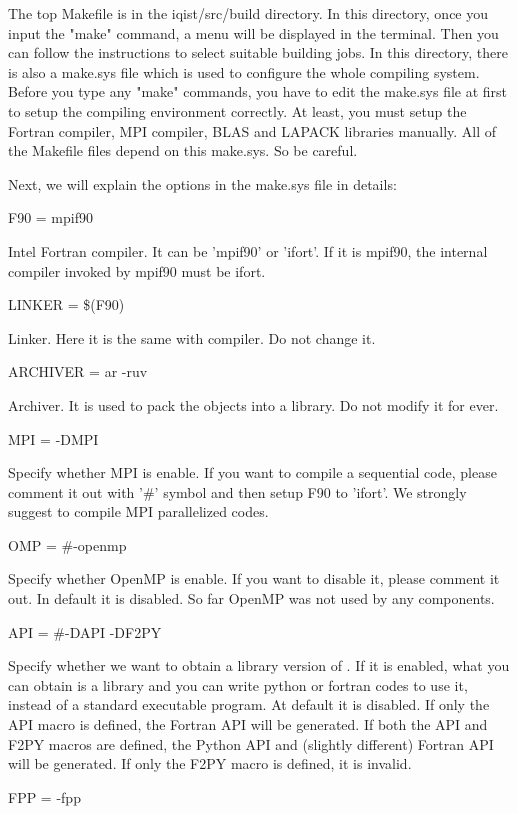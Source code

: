 The top Makefile is in the iqist/src/build directory. In this directory, once you input the "make" command, a menu will be displayed in the terminal. Then you can follow the instructions to select suitable building jobs. In this directory, there is also a make.sys file which is used to configure the whole compiling system. Before you type any "make" commands, you have to edit the make.sys file at first to setup the compiling environment correctly. At least, you must setup the Fortran compiler, MPI compiler, BLAS and LAPACK libraries manually. All of the Makefile files depend on this make.sys. So be careful.

Next, we will explain the options in the make.sys file in details:

{\color{red}F90    = mpif90}

Intel Fortran compiler. It can be 'mpif90' or 'ifort'. If it is mpif90, the internal compiler invoked by mpif90 must be ifort.

{\color{red}LINKER = \$(F90)}

Linker. Here it is the same with compiler. Do not change it.

{\color{red}ARCHIVER = ar -ruv}

Archiver. It is used to pack the objects into a library. Do not modify it for ever.

{\color{red}MPI    = -DMPI}

Specify whether MPI is enable. If you want to compile a sequential code, please comment it out with '\#' symbol and then setup F90 to 'ifort'. We strongly suggest to compile MPI parallelized codes.

{\color{red}OMP    = \#-openmp}

Specify whether OpenMP is enable. If you want to disable it, please
comment it out. In default it is disabled. So far OpenMP was not used
by any components.

{\color{red}API    = \#-DAPI -DF2PY}

Specify whether we want to obtain a library version of {\iqist}. If it is enabled, what you can obtain is a library and you can write python or fortran codes to use it, instead of a standard executable program. At default it is disabled. If only the API macro is defined, the Fortran API will be generated. If both the API and F2PY macros are defined, the Python API and (slightly different) Fortran API will be generated. If only the F2PY macro is defined, it is invalid.

{\color{red}FPP    = -fpp}

